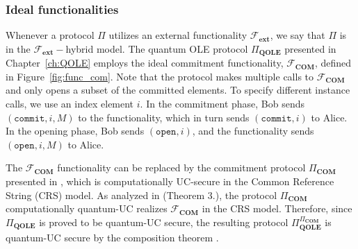 \subsubsection{Ideal functionalities}\label{functinalities}

Whenever a protocol $\Pi$ utilizes an external functionality $\mathcal{F}_{\textbf{ext}}$, we say that $\Pi$ is in the $\mathcal{F}_{\textbf{ext}}-$hybrid model. The quantum OLE protocol $\Pi_{\textbf{QOLE}}$ presented in Chapter~\ref{ch:QOLE} employs the ideal commitment functionality, $\mathcal{F}_{\textbf{COM}}$, defined in Figure~\ref{fig:func_com}. Note that the protocol makes multiple calls to $\mathcal{F}_{\textbf{COM}}$ and only opens a subset of the committed elements. To specify different instance calls, we use an index element $i$. In the commitment phase, Bob sends $(\texttt{commit}, i, M)$ to the functionality, which in turn sends $(\texttt{commit}, i)$ to Alice. In the opening phase, Bob sends $(\texttt{open}, i)$, and the functionality sends $(\texttt{open}, i, M)$ to Alice.

The $\mathcal{F}_{\textbf{COM}}$ functionality can be replaced by the commitment protocol $\Pi_{\textbf{COM}}$ presented in \cite{CF01}, which is computationally UC-secure in the Common Reference String (CRS) model. As analyzed in \cite{CBGLM21} (Theorem 3.), the protocol $\Pi_{\textbf{COM}}$ computationally quantum-UC realizes $\mathcal{F}_{\textbf{COM}}$ in the CRS model. Therefore, since $\Pi_{\textbf{QOLE}}$ is proved to be quantum-UC secure, the resulting protocol $\Pi_{\textbf{QOLE}}^{\Pi_{\textbf{COM}}}$ is quantum-UC secure by the composition theorem \citep{Unruh10}.


%    
%    


